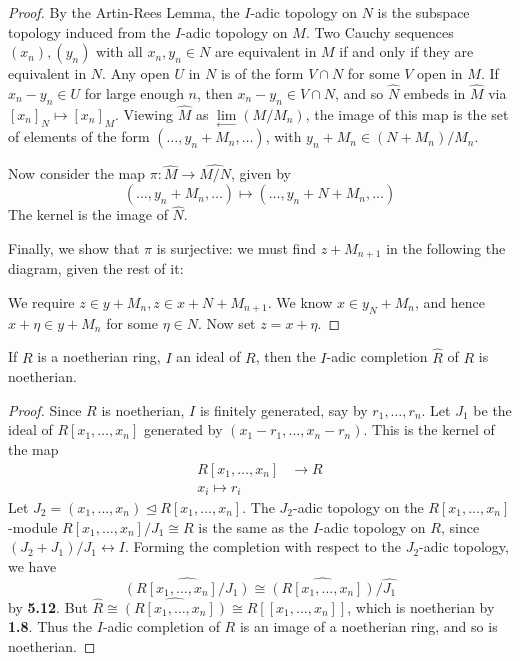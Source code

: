 \documentclass[10pt,a4paper]{article}
\begin{document}
\begin{proof}
  By the Artin-Rees Lemma, the $I$-adic topology on $N$ is the subspace topology induced from the $I$-adic topology on $M$. Two Cauchy sequences $(x_n), (y_n)$ with all $x_n, y_n \in N$ are equivalent in $M$ if and only if they are equivalent in $N$. Any open $U$ in $N$ is of the form $V \cap N$ for some $V$ open in $M$. If $x_n-y_n \in U$ for large enough $n$, then $x_n -y_n \in V\cap N$, and so $\hat{N}$ embeds in $\hat{M}$ via $[x_n]_N \mapsto [x_n]_M$. Viewing $\hat{M}$ as $\lim\limits_\leftarrow (M/M_n)$, the image of this map is the set of elements of the form $(\ldots, y_n+M_n, \ldots)$, with $y_n +M_n \in (N+M_n)/M_n$.

  Now consider the map $\pi:\hat{M} \to \hat{M/N}$, given by
  \[(\ldots, y_n+M_n, \ldots) \mapsto (\ldots, y_n+N+M_n, \ldots)\]
  The kernel is the image of $\hat{N}$.

  Finally, we show that $\pi$ is surjective: we must find $z+M_{n+1}$ in the following the diagram, given the rest of it:
  \begin{center}
  \end{center}
  We require $z \in y + M_n, z \in x + N+M_{n+1}$. We know $x \in y_N+M_n$, and hence $x+\eta \in y+M_n$ for some $\eta \in N$. Now set $z = x+\eta$.
\end{proof}
\begin{proposition}
  If $R$ is a noetherian ring, $I$ an ideal of $R$, then the $I$-adic completion $\hat{R}$ of $R$ is noetherian.
\end{proposition}
\begin{proof}
  Since $R$ is noetherian, $I$ is finitely generated, say by $r_1, \ldots, r_n$. Let $J_1$ be the ideal of $R[x_1, \ldots, x_n]$ generated by $(x_1-r_1, \ldots, x_n-r_n)$. This is the kernel of the map
  \begin{align*}
    R[x_1, \ldots, x_n] &\to R\\
    x_i \mapsto r_i
  \end{align*}
  Let $J_2 = (x_1, \ldots, x_n) \trianglelefteq R[x_1, \ldots, x_n]$. The $J_2$-adic topology on the $R[x_1, \ldots, x_n]$-module $R[x_1, \ldots, x_n]/J_1 \cong R$ is the same as the $I$-adic topology on $R$, since $(J_2 +J_1)/J_1 \leftrightarrow I$. Forming the completion with respect to the $J_2$-adic topology, we have
  \[\hat{(R[x_1, \ldots, x_n]/J_1)} \cong \hat{(R[x_1, \ldots, x_n])}/\hat{J_1}\]
  by \textbf{5.12}. But $\hat{R} \cong \hat{(R[x_1, \ldots, x_n])} \cong R[[x_1, \ldots, x_n]]$, which is noetherian by \textbf{1.8}. Thus the $I$-adic completion of $R$ is an image of a noetherian ring, and so is noetherian.
\end{proof}
\end{document}
